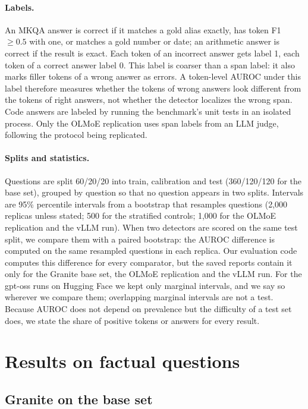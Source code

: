 \documentclass[11pt]{article}
\begin{document}
\paragraph{Labels.}
\label{sec:labels}
An MKQA answer is correct if it matches a gold alias exactly, has token F1 $\ge0.5$ with one, or matches a gold number or date; an arithmetic answer is correct if the result is exact.
Each token of an incorrect answer gets label 1, each token of a correct answer label 0.
This label is coarser than a span label: it also marks filler tokens of a wrong answer as errors.
A token-level AUROC under this label therefore measures whether the tokens of wrong answers look different from the tokens of right answers, not whether the detector localizes the wrong span.
Code answers are labeled by running the benchmark's unit tests in an isolated process.
Only the OLMoE replication uses span labels from an LLM judge, following the protocol being replicated.

\paragraph{Splits and statistics.}
Questions are split 60/20/20 into train, calibration and test (360/120/120 for the base set), grouped by question so that no question appears in two splits.
Intervals are 95\% percentile intervals from a bootstrap that resamples questions (2,000 replicas unless stated; 500 for the stratified controls; 1,000 for the OLMoE replication and the vLLM run).
When two detectors are scored on the same test split, we compare them with a paired bootstrap: the AUROC difference is computed on the same resampled questions in each replica.
Our evaluation code computes this difference for every comparator, but the saved reports contain it only for the Granite base set, the OLMoE replication and the vLLM run.
For the gpt-oss runs on Hugging Face we kept only marginal intervals, and we say so wherever we compare them; overlapping marginal intervals are not a test.
Because AUROC does not depend on prevalence but the difficulty of a test set does, we state the share of positive tokens or answers for every result.

\section{Results on factual questions}
\label{sec:factual}

\subsection{Granite on the base set}
\end{document}

